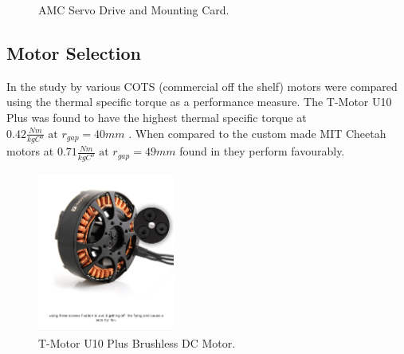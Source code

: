 \begin{figure}
\centering
{}
\caption{AMC Servo Drive and Mounting Card.}
\label{fig:AMC Servo Drive and Mounting Card}
\end{figure}

\subsection{Motor Selection}

In the study by \cite{Kalouche2016} various COTS (commercial off the shelf) motors were compared using the thermal specific torque as a performance measure. The T-Motor U10 Plus was found to have the highest thermal specific torque at $0.42 \frac{Nm}{kgC^o } \text{ at } r_{gap} = 40 mm$ \cite{Kalouche2016}. When compared to the custom made MIT Cheetah motors at $0.71 \frac{Nm}{kgC^o } \text{ at } r_{gap} = 49 mm$ found in \cite{Wang2012} they perform favourably. 

\begin{figure}
\centering
\includegraphics[clip, trim=0cm 5cm 0cm 2cm, width=0.4\textwidth]{images/motor/TMotorU10Plus} 
\caption{T-Motor U10 Plus Brushless DC Motor.}
\label{fig:TMotorU10Plus}
\end{figure}

